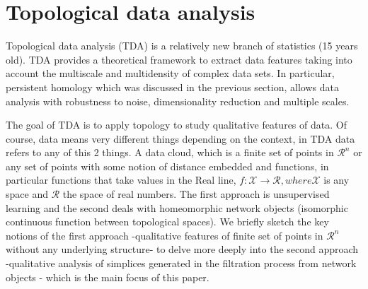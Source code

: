 \documentclass[onecollarge,runningheads]{svjour2}
\begin{document}
\section{Topological data analysis}
\label{se:tda}

Topological data analysis (TDA) is a relatively new branch of statistics (15 years old). TDA provides a theoretical framework to extract data features taking into account the multiscale and multidensity of complex data sets. In particular, persistent homology which was discussed in the previous section, allows data analysis with robustness to noise, dimensionality reduction and multiple scales.

The goal of TDA is to apply topology to study qualitative features of data. Of course, data means very different things depending on the context, in TDA data refers to any of this 2 things. A data cloud, which is  a finite set of points in $\mathcal{R}^n$ or any set of points with some notion of distance embedded and functions, in particular functions that take values in the Real line, $f:\mathcal{X} \to \mathcal{R}, where \mathcal{X}$ is any space and $\mathcal{R}$ the space of real numbers. The first approach is unsupervised learning and the second deals with homeomorphic network objects (isomorphic continuous function between topological spaces). We briefly sketch the key notions of the first approach -qualitative features of finite set of points in $\mathcal{R}^n$ without any underlying structure- to delve more deeply into the second approach -qualitative analysis of simplices generated in the filtration process from network objects - which is the main focus of this paper.
\end{document}
